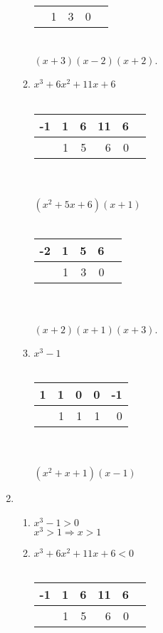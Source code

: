 \documentclass[10pt]{book}
\begin{document}
\begin{enumerate}
\begin{enumerate}
\begin{tabular}{ l | r r r r }
				\hline
			    & 1 & 3 & 0 \\
			\end{tabular}
			\\
			$(x+3)(x-2)(x+2)$.
			\item %
			$x^3+6x^2+11x+6$
			\\
			\\
			\begin{tabular}{ l | r r r r r}
			  -1 & 1 & 6 & 11 & 6\\
				\hline
			    & 1 & 5 & 6 & 0 \\
			\end{tabular}
			\\
			\\
			$(x^2+5x+6)(x+1)$
			\\
			\\
			\begin{tabular}{ l | r r r r }
			  -2 & 1 & 5 & 6 \\
				\hline
			    & 1 & 3 & 0 \\
			\end{tabular}
			\\
			\\
			$(x+2)(x+1)(x+3)$.
			\item %
			$x^3-1$
			\\
			\\
			\begin{tabular}{ l | r r r r }
			  1 & 1 & 0 & 0 & -1 \\
				\hline
			    & 1 & 1 & 1 & 0 \\
			\end{tabular}
			\\
			\\
			$(x^2+x+1)(x-1)$
	\end{enumerate}
	\item %
		\begin{enumerate}
		\item %
			$x^3 - 1 > 0$\\
			$x^3 > 1 \Rightarrow x > 1$
		\item  %
			$x^3 + 6x^2 + 11x + 6 < 0$
			\\
			\\
			\begin{tabular}{ l | r r r r r }
			  -1 & 1 & 6 & 11 & 6 \\
				\hline
			    & 1 & 5 & 6 & 0 \\
			\end{tabular}		

\end{enumerate}
\end{enumerate}
\end{document}

